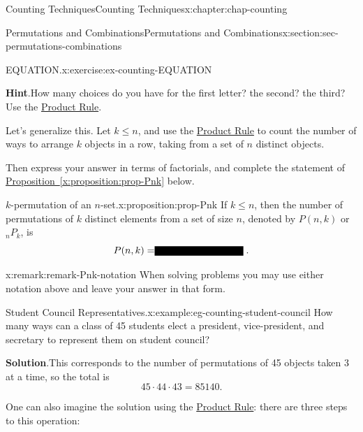 \documentclass[oneside,10pt,]{book}
\newcommand{\blocktitlefont}{\relax}
\newcommand{\xreffont}{\relax}
\newcommand{\fillin}[1]{\leavevmode\leaders\vrule height -1.2pt depth 1.5pt \hskip #1em minus #1em \null}
\numberwithin{equation}{section}
\begin{document}
\begin{chapterptx}{Counting Techniques}{}{Counting Techniques}{}{}{x:chapter:chap-counting}
\begin{sectionptx}{Permutations and Combinations}{}{Permutations and Combinations}{}{}{x:section:sec-permutations-combinations}
\begin{inlineexercise}{EQUATION.}{x:exercise:ex-counting-EQUATION}
\begin{sidebyside}{1}{0.4}{0.4}{0}
\begin{sbspanel}{0.2}
\end{sbspanel}%
\end{sidebyside}%
\par\smallskip%
\noindent\textbf{\blocktitlefont Hint}.\hypertarget{g:hint:id474302}{}\quad{}How many choices do you have for the first letter? the second? the third? Use the \hyperref[x:principle:prin-prod-rule]{Product Rule}.%
\end{inlineexercise}
Let's generalize this. Let \(k \leq n\), and use the \hyperref[x:principle:prin-prod-rule]{Product Rule} to count the number of ways to arrange \(k\) objects in a row, taking from a set of \(n\) distinct objects.%
\par
Then express your answer in terms of factorials, and complete the statement of \hyperref[x:proposition:prop-Pnk]{Proposition~{\xreffont\ref{x:proposition:prop-Pnk}}} below.%
\begin{proposition}{\(k\)-permutation of an \(n\)-set.}{}{x:proposition:prop-Pnk}%
\label{g:notation:id474321} If \(k \leq n\), then the number of permutations of \(k\) distinct elements from a set of size \(n\), denoted by \(P(n,k)\) or \({}_nP_k\), is%
\begin{equation*}
P(n,k) = \fillin{9.090909090909092}\text{.}
\end{equation*}
%
\end{proposition}
\begin{remark}{}{x:remark:remark-Pnk-notation}%
When solving problems you may use either notation above and leave your answer in that form.%
\end{remark}
\begin{example}{Student Council Representatives.}{x:example:eg-counting-student-council}%
How many ways can a class of 45 students elect a president, vice-president, and secretary to represent them on student council?%
\par\smallskip%
\noindent\textbf{\blocktitlefont Solution}.\hypertarget{g:solution:id474392}{}\quad{}This corresponds to the number of permutations of 45 objects taken 3 at a time, so the total is%
\begin{equation*}
45 \cdot 44 \cdot 43 = 85140\text{.}
\end{equation*}
%
\par
One can also imagine the solution using the \hyperref[x:principle:prin-prod-rule]{Product Rule}: there are three steps to this operation:%
\begin{sidebyside}{1}{0.15}{0.15}{0}%
\begin{sbspanel}{0.7}%
{\centering%
}
\end{sbspanel}
\end{sidebyside}
\end{example}
\end{sectionptx}
\end{chapterptx}
\end{document}
